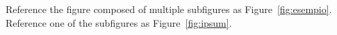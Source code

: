 \begin{comment}
"We are creating a world that all may enter without privilege or prejudice
accorded by race, economic power, military force, or station of birth."
“We are creating a world where anyone, anywhere may express his or her beliefs, no matter how singu-
lar, without fear of being coerced into silence or conformity.” (Barlow 1996)
--> oder auch nicht --> siehe oben; community networks versuchen das aber wirklich umzusetzen

"Especially in American research and critical comment, there
seems to be a widely shared view according to which the Internet allows capillary configurations
of power – local initiatives, ad-hoc pressure groups, fan cultures, “issue publics” – to challenge
the statutory powers that be." (p.4)
--> aber um diese ueberhaupt moeglich zu sein, brauchen die Leute erstmal einen Zugang zu einer physischen Infrastruktur, der gar nicht so selbsverstaendlich gegeben ist.
--> koloniale Zusammenhaenge und Logiken werden reproduziert; aufgrund von geographischen (schwieriges Terrain), oekonomischen (Anbindung lohnt sich fuer kommerzielle Anbierter*innen nicht), politischen (der Staat oder X, dass sich Y Verhoer verschaffen kann) Gruende, haben Menschen keinen Zugriff zum Internet

[PHPHLT2016]
"we are interested in how the digital has become
part of the material, sensory and social worlds we inhabit,"
--> denk an Routern und Anthennen im phys. Raum --> Videos vom Anthennenaufbau

"how inequality is extended, reproduced or complicated by digital media technologies" --> kann leider nicht befriedigend beurteilen aus der ferne, aber ich würde eher für das gegenteil argumentieren beim projekt: es ist ein versuch, the digital devide zu schließen (bridging the digital devide);

\end{comment}

Reference the figure composed of multiple subfigures as Figure~\vref{fig:esempio}. Reference one of the subfigures as Figure~\vref{fig:ipsum}. %

